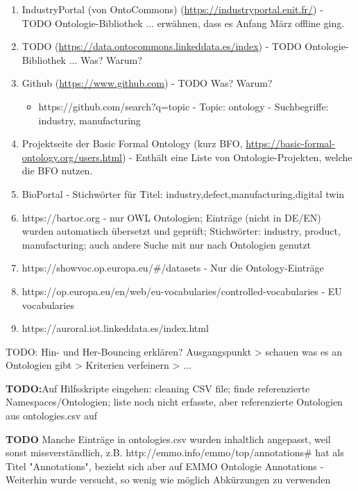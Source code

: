 \documentclass{article}
\begin{document}
\begin{enumerate}
    \item IndustryPortal (von OntoCommons) (\url{https://industryportal.enit.fr/}) - TODO Ontologie-Bibliothek ... erwähnen, dass es Anfang März offline ging.
    \item TODO (\url{https://data.ontocommons.linkeddata.es/index}) - TODO Ontologie-Bibliothek ... Was? Warum?
    \item Github (\url{https://www.github.com}) - TODO Was? Warum?
       \begin{itemize}
           \item https://github.com/search?q=topic%
           - Topic: ontology
           - Suchbegriffe: industry, manufacturing
       \end{itemize}
    \item Projektseite der Basic Formal Ontology (kurz BFO, \url{https://basic-formal-ontology.org/users.html}) - Enthält eine Liste von Ontologie-Projekten, welche die BFO nutzen.
    \item BioPortal - Stichwörter für Titel: industry,defect,manufacturing,digital twin
    \item https://bartoc.org - nur OWL Ontologien; Einträge (nicht in DE/EN) wurden automatisch übersetzt und geprüft; Stichwörter: industry, product, manufacturing; auch andere Suche mit nur nach Ontologien genutzt
    \item https://showvoc.op.europa.eu/#/datasets - Nur die Ontology-Einträge
    \item https://op.europa.eu/en/web/eu-vocabularies/controlled-vocabularies - EU vocabularies
    \item https://auroral.iot.linkeddata.es/index.html
\end{enumerate}

TODO: Hin- und Her-Bouncing erklären? Ausgangspunkt > schauen was es an Ontologien gibt > Kriterien verfeinern > ...

\textbf{TODO:}Auf Hilfsskripte eingehen: cleaning CSV file; finde referenzierte Namespaces/Ontologien; liste noch nicht erfasste, aber referenzierte Ontologien aus ontologies.csv auf

\textbf{TODO} Manche Einträge in ontologies.csv wurden inhaltlich angepasst, weil sonst missverständlich, z.B. http://emmo.info/emmo/top/annotations\# hat als Titel "Annotations", bezieht sich aber auf EMMO Ontologie Annotations
- Weiterhin wurde versucht, so wenig wie möglich Abkürzungen zu verwenden
\end{document}
